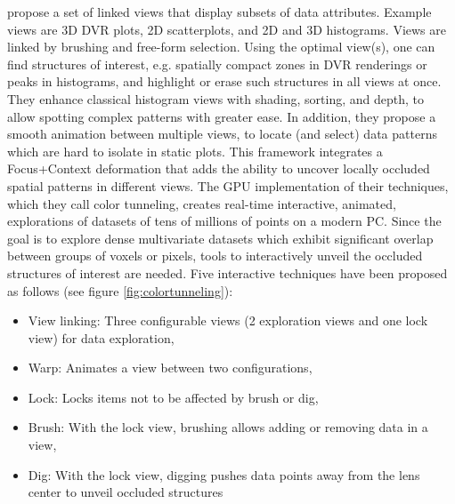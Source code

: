 \cite{6787171} propose a set of linked views that display
subsets of data attributes. Example views are 3D DVR plots, 2D
scatterplots, and 2D and 3D histograms. Views are linked by brushing
and free-form selection. Using the optimal view(s), one can find structures
of interest, e.g. spatially compact zones in DVR renderings or peaks in histograms, and highlight or erase such structures in all views
at once. They enhance classical histogram views with shading, sorting,
and depth, to allow spotting complex patterns with greater ease. In addition, they
propose a smooth animation between multiple views, to locate (and select)
data patterns which are hard to isolate in static plots. This framework integrates
a Focus+Context deformation that adds the ability to uncover locally occluded
spatial patterns in different views. The GPU implementation of their
techniques, which they call color tunneling, creates real-time interactive,
animated, explorations of datasets of tens of millions of points
on a modern PC. Since the goal is to explore dense multivariate datasets which exhibit significant
overlap between groups of voxels or pixels, tools to
interactively unveil the occluded structures of interest are needed.
Five interactive techniques have been proposed as follows (see figure \ref{fig:colortunneling}):
\begin{itemize}
\item View linking: Three configurable views (2 exploration views and one lock view) for data exploration,
\item Warp: Animates a view between two configurations,
\item Lock: Locks items not to be affected by brush or dig,
\item Brush: With the lock view, brushing allows adding or removing
data in a view,
\item Dig: With the lock view, digging pushes data points away from
the lens center to unveil occluded structures 

\end{itemize}

